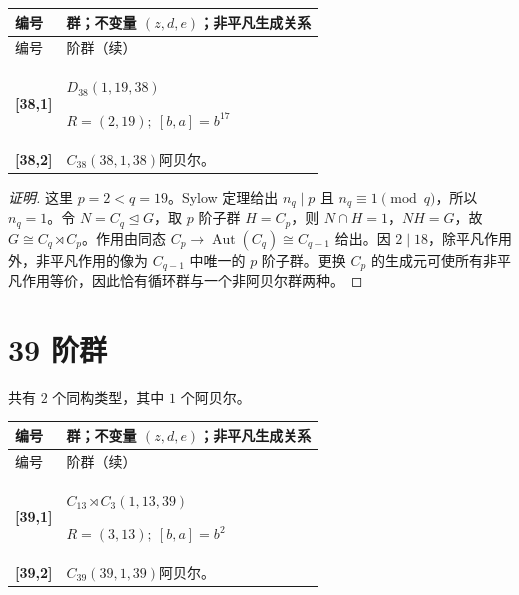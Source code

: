 \documentclass[UTF8,fontset=fandol,11pt,a4paper]{ctexart}
\newcommand{\Aut}{\operatorname{Aut}}\newcommand{\GL}{\operatorname{GL}}\newcommand{\ord}{\operatorname{ord}}\newcommand{\Z}{\mathrm Z}
\begin{document}
\begin{longtable}{@{}p{17mm}>{\raggedright\arraybackslash}p{141mm}@{}}

\toprule 编号 & 群；不变量 $(z,d,e)$；非平凡生成关系\\\midrule\endfirsthead

\toprule 编号 & 38 阶群（续）\\\midrule\endhead\bottomrule\endfoot

\textbf{[38,1]} & $D_{38}$\quad $(1,19,38)$\par\(R=(2,19);\allowbreak\ [b,a]=b^{17}\)\\[3pt]

\textbf{[38,2]} & $C_{38}$\quad $(38,1,38)$\quad 阿贝尔。\\[3pt]

\end{longtable}\endgroup

\begin{proof}[证明]
这里 $p=2<q=19$。Sylow 定理给出 $n_q\mid p$ 且 $n_q\equiv1\pmod q$，所以 $n_q=1$。令 $N=C_q\trianglelefteq G$，取 $p$ 阶子群 $H=C_p$，则 $N\cap H=1$，$NH=G$，故 $G\cong C_q\rtimes C_p$。作用由同态 $C_p\to\Aut(C_q)\cong C_{q-1}$ 给出。因 $2\mid 18$，除平凡作用外，非平凡作用的像为 $C_{q-1}$ 中唯一的 $p$ 阶子群。更换 $C_p$ 的生成元可使所有非平凡作用等价，因此恰有循环群与一个非阿贝尔群两种。
\end{proof}

\section*{39 阶群}\label{order:39}

共有 $2$ 个同构类型，其中 $1$ 个阿贝尔。

\begingroup\small\setlength{\tabcolsep}{3pt}\renewcommand{\arraystretch}{1.12}

\begin{longtable}{@{}p{17mm}>{\raggedright\arraybackslash}p{141mm}@{}}

\toprule 编号 & 群；不变量 $(z,d,e)$；非平凡生成关系\\\midrule\endfirsthead

\toprule 编号 & 39 阶群（续）\\\midrule\endhead\bottomrule\endfoot

\textbf{[39,1]} & $C_{13}\rtimes C_{3}$\quad $(1,13,39)$\par\(R=(3,13);\allowbreak\ [b,a]=b^{2}\)\\[3pt]

\textbf{[39,2]} & $C_{39}$\quad $(39,1,39)$\quad 阿贝尔。\\[3pt]

\end{longtable}\endgroup
\end{document}
